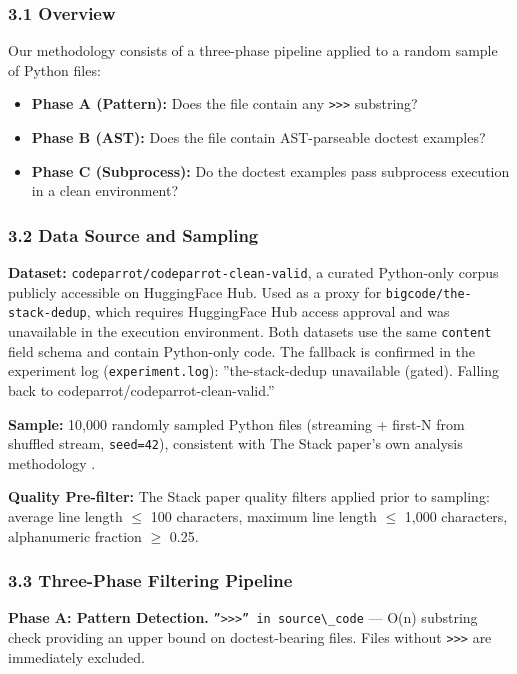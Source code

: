 
\subsubsection{3.1 Overview}

Our methodology consists of a three-phase pipeline applied to a random sample of Python files:

\begin{itemize}
\item \textbf{Phase A (Pattern):} Does the file contain any \texttt{>>>} substring?
\item \textbf{Phase B (AST):} Does the file contain AST-parseable doctest examples?
\item \textbf{Phase C (Subprocess):} Do the doctest examples pass subprocess execution in a clean environment?
\end{itemize}

\subsubsection{3.2 Data Source and Sampling}

\textbf{Dataset:} \texttt{codeparrot/codeparrot-clean-valid}, a curated Python-only corpus publicly
accessible on HuggingFace Hub. Used as a proxy for \texttt{bigcode/the-stack-dedup}, which requires
HuggingFace Hub access approval and was unavailable in the execution environment. Both datasets
use the same \texttt{content} field schema and contain Python-only code. The fallback is confirmed in
the experiment log (\texttt{experiment.log}): ''the-stack-dedup unavailable (gated). Falling back to
codeparrot/codeparrot-clean-valid.''

\textbf{Sample:} 10,000 randomly sampled Python files (streaming + first-N from shuffled stream,
\texttt{seed=42}), consistent with The Stack paper's own analysis methodology \citep{Kocetkov2022}.

\textbf{Quality Pre-filter:} The Stack paper quality filters applied prior to sampling: average
line length $\leq$ 100 characters, maximum line length $\leq$ 1,000 characters, alphanumeric fraction
$\geq$ 0.25.

\subsubsection{3.3 Three-Phase Filtering Pipeline}

\textbf{Phase A: Pattern Detection.} \texttt{''>>>'' in source\textbackslash \_code} --- O(n) substring check providing
an upper bound on doctest-bearing files. Files without \texttt{>>>} are immediately excluded.

